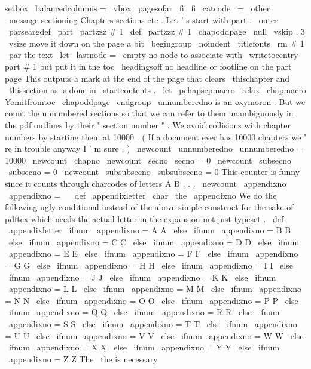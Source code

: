 {{{{setbox
\
balancedcolumns
=
\
vbox
{
\
pagesofar
}
%
\
fi
\
fi
%
}
\
catcode
\
=
\
other
\
message
{
sectioning
}
%
Chapters
sections
etc
.
%
Let
'
s
start
with
part
.
\
outer
\
parseargdef
\
part
{
\
partzzz
{
#
1
}
}
\
def
\
partzzz
#
1
{
%
\
chapoddpage
\
null
\
vskip
.
3
\
vsize
%
move
it
down
on
the
page
a
bit
\
begingroup
\
noindent
\
titlefonts
\
rm
#
1
\
par
%
the
text
\
let
\
lastnode
=
\
empty
%
no
node
to
associate
with
\
writetocentry
{
part
}
{
#
1
}
{
}
%
but
put
it
in
the
toc
\
headingsoff
%
no
headline
or
footline
on
the
part
page
%
This
outputs
a
mark
at
the
end
of
the
page
that
clears
\
thischapter
%
and
\
thissection
as
is
done
in
\
startcontents
.
\
let
\
pchapsepmacro
\
relax
\
chapmacro
{
}
{
Yomitfromtoc
}
{
}
%
\
chapoddpage
\
endgroup
}
%
\
unnumberedno
is
an
oxymoron
.
But
we
count
the
unnumbered
%
sections
so
that
we
can
refer
to
them
unambiguously
in
the
pdf
%
outlines
by
their
"
section
number
"
.
We
avoid
collisions
with
chapter
%
numbers
by
starting
them
at
10000
.
(
If
a
document
ever
has
10000
%
chapters
we
'
re
in
trouble
anyway
I
'
m
sure
.
)
\
newcount
\
unnumberedno
\
unnumberedno
=
10000
\
newcount
\
chapno
\
newcount
\
secno
\
secno
=
0
\
newcount
\
subsecno
\
subsecno
=
0
\
newcount
\
subsubsecno
\
subsubsecno
=
0
%
This
counter
is
funny
since
it
counts
through
charcodes
of
letters
A
B
.
.
.
\
newcount
\
appendixno
\
appendixno
=
\
%
%
\
def
\
appendixletter
{
\
char
\
the
\
appendixno
}
%
We
do
the
following
ugly
conditional
instead
of
the
above
simple
%
construct
for
the
sake
of
pdftex
which
needs
the
actual
%
letter
in
the
expansion
not
just
typeset
.
%
\
def
\
appendixletter
{
%
\
ifnum
\
appendixno
=
A
A
%
\
else
\
ifnum
\
appendixno
=
B
B
%
\
else
\
ifnum
\
appendixno
=
C
C
%
\
else
\
ifnum
\
appendixno
=
D
D
%
\
else
\
ifnum
\
appendixno
=
E
E
%
\
else
\
ifnum
\
appendixno
=
F
F
%
\
else
\
ifnum
\
appendixno
=
G
G
%
\
else
\
ifnum
\
appendixno
=
H
H
%
\
else
\
ifnum
\
appendixno
=
I
I
%
\
else
\
ifnum
\
appendixno
=
J
J
%
\
else
\
ifnum
\
appendixno
=
K
K
%
\
else
\
ifnum
\
appendixno
=
L
L
%
\
else
\
ifnum
\
appendixno
=
M
M
%
\
else
\
ifnum
\
appendixno
=
N
N
%
\
else
\
ifnum
\
appendixno
=
O
O
%
\
else
\
ifnum
\
appendixno
=
P
P
%
\
else
\
ifnum
\
appendixno
=
Q
Q
%
\
else
\
ifnum
\
appendixno
=
R
R
%
\
else
\
ifnum
\
appendixno
=
S
S
%
\
else
\
ifnum
\
appendixno
=
T
T
%
\
else
\
ifnum
\
appendixno
=
U
U
%
\
else
\
ifnum
\
appendixno
=
V
V
%
\
else
\
ifnum
\
appendixno
=
W
W
%
\
else
\
ifnum
\
appendixno
=
X
X
%
\
else
\
ifnum
\
appendixno
=
Y
Y
%
\
else
\
ifnum
\
appendixno
=
Z
Z
%
%
The
\
the
is
necessary
}}}}
